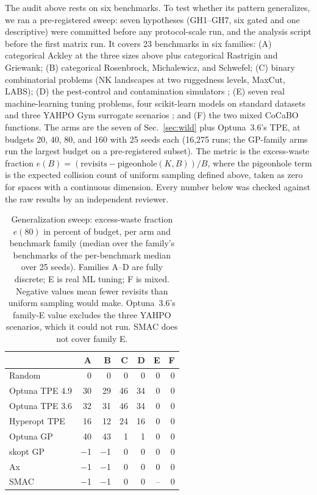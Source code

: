 \documentclass[%
 aip,
 amsmath,amssymb,
 floatfix,
 reprint,%
]{revtex4-1}
\begin{document}
The audit above rests on six benchmarks. To test whether its pattern
generalizes, we ran a pre-registered sweep: seven hypotheses (GH1--GH7,
six gated and one descriptive) were committed before any
protocol-scale run, and the analysis script before the first matrix
run. It covers 23 benchmarks in six families: (A) categorical Ackley at
the three sizes above plus categorical Rastrigin and Griewank; (B)
categorical Rosenbrock, Michalewicz, and Schwefel; (C) binary
combinatorial problems (NK landscapes at two ruggedness levels, MaxCut,
LABS); (D) the pest-control and contamination simulators
\cite{oh2019combo}; (E) seven real machine-learning tuning problems,
four scikit-learn models on standard datasets and three YAHPO Gym
surrogate scenarios \cite{pfisterer2022yahpo}; and (F) the two mixed
CoCaBO functions. The arms are the seven of Sec.~\ref{sec:wild} plus
Optuna~3.6's TPE, at budgets 20, 40, 80, and 160 with 25 seeds each
(16{,}275 runs; the GP-family arms run the largest budget on a
pre-registered subset). The metric is the excess-waste fraction
$e(B) = (\text{revisits} - \text{pigeonhole}(K,B))/B$, where the
pigeonhole term is the expected collision count of uniform sampling
defined above, taken as zero for spaces with a continuous dimension.
Every number below was checked against the raw results by an
independent reviewer.

\begin{table}[t]
\caption{\label{tab:sweep}Generalization sweep: excess-waste fraction
$e(80)$ in percent of budget, per arm and benchmark family (median over
the family's benchmarks of the per-benchmark median over 25 seeds).
Families A--D are fully discrete; E is real ML tuning; F is mixed.
Negative values mean fewer revisits than uniform sampling would make.
Optuna~3.6's family-E value excludes the three YAHPO scenarios, which
it could not run. SMAC does not cover family E.}
\begin{ruledtabular}
\begin{tabular}{lrrrrrr}
 & A & B & C & D & E & F \\
\hline
Random          & 0  & 0  & 0  & 0  & 0 & 0 \\
Optuna TPE 4.9  & 30 & 29 & 46 & 34 & 0 & 0 \\
Optuna TPE 3.6  & 32 & 31 & 46 & 34 & 0 & 0 \\
Hyperopt TPE    & 16 & 12 & 24 & 16 & 0 & 0 \\
Optuna GP       & 40 & 43 & 1  & 1  & 0 & 0 \\
skopt GP        & $-$1 & $-$1 & 0 & 0 & 0 & 0 \\
Ax              & $-$1 & $-$1 & 0 & 0 & 0 & 0 \\
SMAC            & $-$1 & $-$1 & 0 & 0 & -- & 0 \\
\end{tabular}
\end{ruledtabular}
\end{table}
\end{document}
